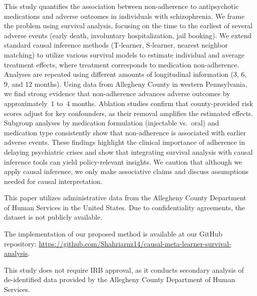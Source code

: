 \begin{ChThreeAbstract}
This study quantifies the association between non-adherence to antipsychotic medications and adverse outcomes in individuals with schizophrenia. 
We frame the problem using survival analysis, focusing on the time to the earliest of several adverse events (early death, involuntary hospitalization, jail booking).
We extend standard causal inference methods (T-learner, S-learner, nearest neighbor matching) to utilize various survival models to estimate individual and average treatment effects, where treatment corresponds to medication non-adherence. 
Analyses are repeated using different amounts of longitudinal information (3, 6, 9, and 12 months). 
Using data from Allegheny County in western Pennsylvania, we find strong evidence that non-adherence advances adverse outcomes by approximately~1 to~4 months. 
Ablation studies confirm that county-provided risk scores adjust for key confounders, as their removal amplifies the estimated effects. 
Subgroup analyses by medication formulation (injectable vs.~oral) and medication type consistently show that non-adherence is associated with earlier adverse events. 
These findings highlight the clinical importance of adherence in delaying psychiatric crises and show that integrating survival analysis with causal inference tools can yield policy-relevant insights. 
We caution that although we apply causal inference, we only make associative claims and discuss assumptions needed for causal interpretation.
\end{ChThreeAbstract}



This paper utilizes administrative data from the Allegheny County Department of Human Services in the United States. 
Due to confidentiality agreements, the dataset is not publicly available.

The implementation of our proposed method is available at our GitHub repository: \linebreak
\url{https://github.com/Shahriarnz14/causal-meta-learner-survival-analysis}.

This study does not require IRB approval, as it conducts secondary analysis of de-identified data provided by the Allegheny County Department of Human Services.






